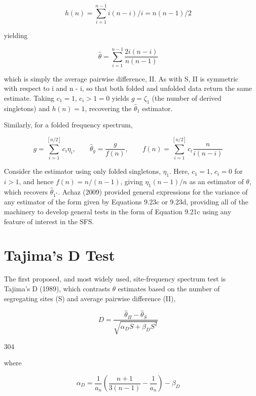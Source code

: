 \documentclass{article}
\begin{document}
\begin{equation}
h(n)=\sum_{i=1}^{n-1}i(n-i)/i=n(n-1)/2
\end{equation}

yielding

\begin{equation}
\widehat{\theta}=\sum_{i=1}^{n-1}\frac{2i(n-i)}{n(n-1)}
\end{equation}

which is simply the average pairwise difference, II. As with S, II is symmetric with respect to i and n - i, so that both folded and unfolded data return the same estimate. Taking  $ c_1 = 1 $,  $ c_i > 1 = 0 $ yields  $ g = \zeta_1 $ (the number of derived singletons) and  $ h(n) = 1 $, recovering the  $ \widehat{\theta}_1 $ estimator.

Similarly, for a folded frequency spectrum,

\begin{equation}
g=\sum_{i=1}^{[n/2]}c_{i}\eta_{i},\qquad\widehat{\theta}_{g}=\frac{g}{f(n)},\qquad f(n)=\sum_{i=1}^{[n/2]}c_{i}\frac{n}{i(n-i)}
\tag{9.23d}
\label{eq:9_23d}
\end{equation}

Consider the estimator using only folded singletons,  $ \eta_1 $. Here,  $ c_1 = 1 $,  $ c_i = 0 $ for  $ i > 1 $, and hence  $ f(n) = n/(n-1) $, giving  $ \eta_1(n-1)/n $ as an estimator of  $ \theta $, which recovers  $ \widehat{\theta}_{1^*} $. Achaz (2009) provided general expressions for the variance of any estimator of the form given by Equations 9.23c or 9.23d, providing all of the machinery to develop general tests in the form of Equation 9.21c using any feature of interest in the SFS.

\section{Tajima's D Test}
The first proposed, and most widely used, site-frequency spectrum test is Tajima's D (1989), which contrasts  $ \theta $ estimates based on the number of segregating sites (S) and average pairwise difference (II),

\begin{equation}
D=\frac{\widehat{\theta}_{\Pi}-\widehat{\theta}_{S}}{\sqrt{\alpha_{D}S+\beta_{D}S^{2}}}
\tag{9.24a}
\label{eq:9_24a}
\end{equation}

304

where

\begin{equation}
\alpha_{D}=\frac{1}{a_{n}}\left(\frac{n+1}{3(n-1)}-\frac{1}{a_{n}}\right)-\beta_{D}
\tag{9.24b}
\label{eq:9_24b}
\end{equation}
\end{document}
